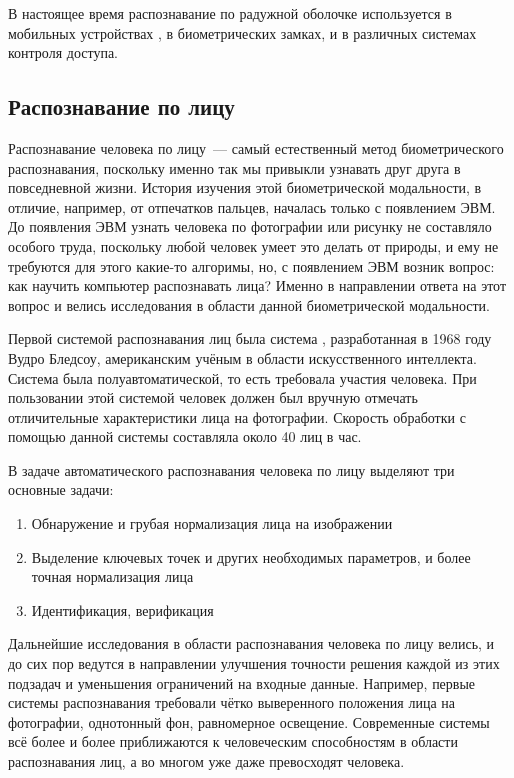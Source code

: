 \documentclass[14pt, a4paper]{extarticle}
\begin{document}
В настоящее время распознавание по радужной оболочке используется в мобильных устройствах \cite{odinokikh2018high}, в биометрических замках, и в различных системах контроля доступа.

\subsection{Распознавание по лицу}
Распознавание человека по лицу~--- самый естественный метод биометрического распознавания, поскольку именно так мы привыкли узнавать друг друга в повседневной жизни. История изучения этой биометрической модальности, в отличие, например, от отпечатков пальцев, началась только с появлением ЭВМ. До появления ЭВМ узнать человека по фотографии или рисунку не составляло особого труда, поскольку любой человек умеет это делать от природы, и ему не требуются для этого какие-то алгоримы, но, с появлением ЭВМ возник вопрос: как научить компьютер распознавать лица? Именно в направлении ответа на этот вопрос и велись исследования в области данной биометрической модальности.

Первой системой распознавания лиц была система \cite{bledsoe1968face}, разработанная в 1968 году Вудро Бледсоу, американским учёным в области искусственного интеллекта. Система была полуавтоматической, то есть требовала участия человека. При пользовании этой системой человек должен был вручную отмечать отличительные характеристики лица на фотографии. Скорость обработки с помощью данной системы составляла около 40 лиц в час.

В задаче автоматического распознавания человека по лицу выделяют три основные задачи:
\begin{enumerate}
	\item Обнаружение и грубая нормализация лица на изображении
	\item Выделение ключевых точек и других необходимых параметров, и более точная нормализация лица
	\item Идентификация, верификация
\end{enumerate}

Дальнейшие исследования в области распознавания человека по лицу велись, и до сих пор ведутся в направлении улучшения точности решения каждой из этих подзадач и уменьшения ограничений на входные данные. Например, первые системы распознавания требовали чётко выверенного положения лица на фотографии, однотонный фон, равномерное освещение. Современные системы всё более и более приближаются к человеческим способностям в области распознавания лиц, а во многом уже даже превосходят человека.
\end{document}
